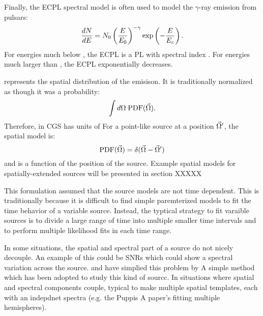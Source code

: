 Finally, the \gls{ECPL} spectral model is often
used to model the $\gamma$-ray emission from pulsars:
\begin{equation}
  \frac{dN}{dE} = N_0 \left(\frac{E}{E_0}\right)^{-\gamma}
  \exp\left(-\frac{E}{E_c}\right).
\end{equation}
For energies much below \Ecutoff, 
the \gls{ECPL} is a \gls{PL} with spectral index \spectralindex.
For energies much larger than \Ecutoff, the \gls{ECPL}
exponentially decreases.

\pdf represents the spatial distribution of the emisison.
It is traditionally normalized as though it was a probability:
  \begin{equation}
    \int d\Omega \; \text{PDF}(\vec\Omega).
  \end{equation}
Therefore, in \gls{CGS} \pdf has units of \pdfunits
For a point-like source at a position $\vec\Omega'$, the spatial model is:
  \begin{equation}
    \text{PDF}(\vec\Omega) = \delta(\vec\Omega - \vec\Omega')
  \end{equation}
and is a function of the position of the source.
Example spatial models for spatially-extended sources will be presented
in section XXXXX


This formulation assumed that the source models are not time dependent.
This is traditionally because it is difficult to find simple paremterized
models to fit the time behavior of a variable source. Instead, the typtical
strategy to fit varaible sources is to divide a large range of time
into multiple smaller time intervals 
and to perform multiple likelihood fits in each time range.

In some situations, the spatial and spectral part of a source do not nicely decouple.
An example of this could be \glspl{SNR} which could show a spectral variation
across the source. 
\cite{katsuta_2012_fermi-lat-observation} and \cite{hewitt_2012_fermi-lat-observations} have
simplied this problem by
A simple method which has been adopted to study
this kind of sourcc. 
In situations where spatial and spectral components couple, typical to make
multiple spatial templates, each with an indepdnet spectra (e.g. the Puppis A paper's
fitting multiple hemispheres).

